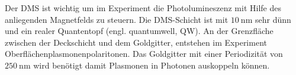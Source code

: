 Der DMS ist wichtig um im Experiment die Photolumineszenz mit Hilfe des anliegenden
Magnetfelds zu steuern. 
Die DMS-Schicht ist mit $\SI{10}{\nano\meter}$ sehr dünn und ein realer Quantentopf (engl. quantumwell, QW).
An der Grenzfläche zwischen der Deckschicht und dem Goldgitter, entstehen im Experiment Oberflächenplasmonenpolaritonen.
Das Goldgitter mit einer Periodizität von $\SI{250}{\nano\meter}$ wird benötigt damit Plasmonen in Photonen
auskoppeln können.